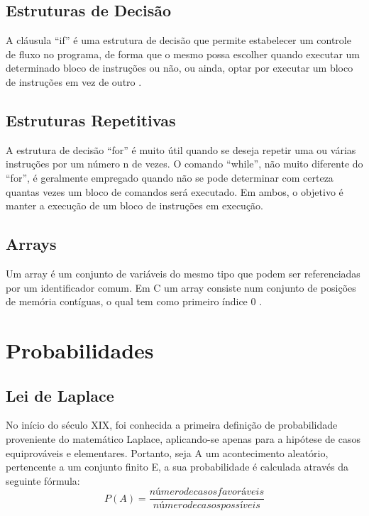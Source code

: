 \documentclass{report}
\begin{document}
\subsection{Estruturas de Decisão}
A cláusula “if” é uma estrutura de decisão que permite estabelecer um controle de fluxo no programa, de forma que o mesmo possa escolher quando executar um determinado bloco de instruções ou não, ou ainda, optar por executar um bloco de instruções em vez de outro \cite{manual}.

\subsection{Estruturas Repetitivas}
A estrutura de decisão “for” é muito útil quando se deseja repetir uma ou várias instruções por um número n de vezes. O comando “while”, não muito diferente do “for”, é geralmente empregado quando não se pode determinar com certeza quantas vezes um bloco de comandos será executado. Em ambos, o objetivo é manter a execução de um bloco de instruções em execução.\\
\subsection{Arrays}
Um array é um conjunto de variáveis do mesmo tipo que podem ser referenciadas por um identificador comum. Em C um array consiste num conjunto de posições de memória contíguas, o qual tem como primeiro índice 0 \cite{silva}.


\section{Probabilidades}

\subsection{Lei de Laplace}
No início do século XIX, foi conhecida a primeira definição de probabilidade proveniente do matemático Laplace, aplicando-se apenas para a hipótese de casos equiprováveis e elementares. Portanto, seja A um acontecimento aleatório, pertencente a um conjunto finito E, a sua probabilidade é calculada através da seguinte fórmula:
\begin{equation} \label{eq1}
P(A)=\frac{número de casos favoráveis}{número de casos possíveis}
\end{equation}
\end{document}
